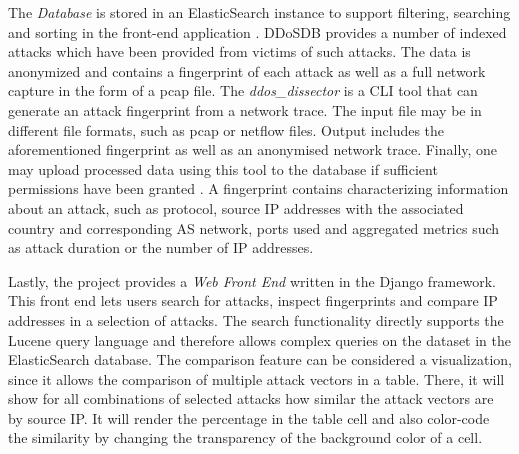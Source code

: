 The \emph{Database} is stored in an ElasticSearch instance to support filtering, searching and sorting in the front-end application \cite{ddosdb-help}.
DDoSDB provides a number of indexed attacks which have been provided from victims of such attacks. The data is anonymized and contains a fingerprint of each attack as well as a full network capture in the form of a pcap file. \cite{ddos_dissector}
The \emph{ddos\_dissector} is a CLI tool that can generate an attack fingerprint from a network trace. The input file may be in different file formats, such as pcap or netflow files.
Output includes the aforementioned fingerprint as well as an anonymised network trace. Finally, one may upload processed data using this tool to the database if sufficient permissions have been granted \cite{ddos_dissector}.
A fingerprint contains characterizing information about an attack, such as protocol, source IP addresses with the associated country and corresponding AS network, ports used and aggregated metrics such as attack duration or the number of IP addresses\cite{ddosdb}.

Lastly, the project provides a \emph{Web Front End} written in the Django framework. This front end lets users search for attacks, inspect fingerprints and compare IP addresses in a selection of attacks.
The search functionality directly supports the Lucene query language and therefore allows complex queries on the dataset in the ElasticSearch database.
The comparison feature can be considered a visualization, since it allows the comparison of multiple attack vectors in a table. There, it will show for all combinations of selected attacks how similar the attack vectors are by source IP. It will render the percentage in the table cell and also color-code the similarity by changing the transparency of the background color of a cell\cite{ddosdb}.

